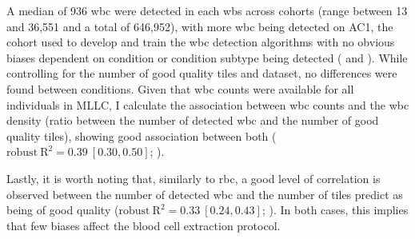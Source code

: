 A median of 936 \ac{wbc} were detected in each \ac{wbs} across cohorts (range between 13 and 36,551 and a total of 646,952), with more \ac{wbc} being detected on AC1, the cohort used to develop and train the \ac{wbc} detection algorithms with no obvious biases dependent on condition or condition subtype being detected ( and ). While controlling for the number of good quality tiles and dataset, no differences were found between conditions. Given that \ac{wbc} counts were available for all individuals in MLLC, I calculate the association between \ac{wbc} counts and the \ac{wbc} density (ratio between the number of detected \ac{wbc} and the number of good quality tiles), showing good association between both ($\mathrm{robust\ R}^2=0.39\ [0.30,0.50]$; ).

\begin{figure}[!ht]
    \label{fig:wbc-count-coarse}
\end{figure}

\begin{figure}[!ht]
    \label{fig:wbc-count-fine}
\end{figure}

\begin{figure}[!ht]
    \label{fig:wbc-count-association}
\end{figure}

Lastly, it is worth noting that, similarly to \ac{rbc}, a good level of correlation is observed between the number of detected \ac{wbc} and the number of tiles predict as being of good quality ($\mathrm{robust\ R}^2=0.33\ [0.24,0.43]$; ). In both cases, this implies that few biases affect the blood cell extraction protocol. 

\begin{figure}[!ht]
    \label{fig:wbc-quality-tiles}
\end{figure}

